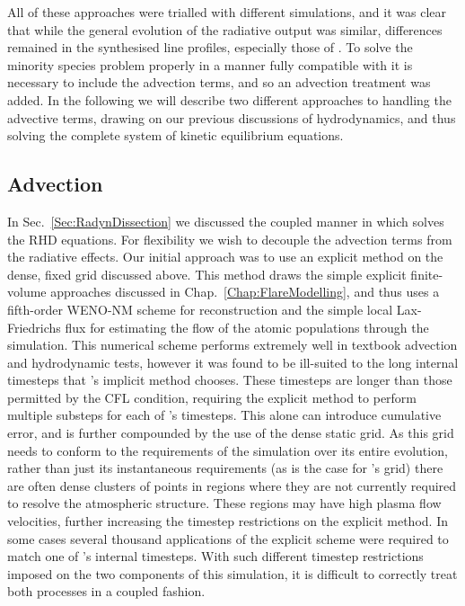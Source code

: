 All of these approaches were trialled with different \Radyn{} simulations, and it was clear that while the general evolution of the radiative output was similar, differences remained in the synthesised line profiles, especially those of \Caii{}.
To solve the minority species problem properly in a manner fully compatible with \Radyn{} it is necessary to include the advection terms, and so an advection treatment was added.
In the following we will describe two different approaches to handling the advective terms, drawing on our previous discussions of hydrodynamics, and thus solving the complete system of kinetic equilibrium equations.

\subsection{Advection}\label{Sec:MsLwAdvection}

In Sec.~\ref{Sec:RadynDissection} we discussed the coupled manner in which \Radyn{} solves the RHD equations.
For flexibility we wish to decouple the advection terms from the radiative effects.
Our initial approach was to use an explicit method on the dense, fixed grid discussed above.
This method draws the simple explicit finite-volume approaches discussed in Chap.~\ref{Chap:FlareModelling}, and thus uses a fifth-order WENO-NM scheme for reconstruction and the simple local Lax-Friedrichs flux for estimating the flow of the atomic populations through the simulation.
This numerical scheme performs extremely well in textbook advection and hydrodynamic tests, however it was found to be ill-suited to the long internal timesteps that \Radyn{}'s implicit method chooses.
These timesteps are longer than those permitted by the CFL condition, requiring the explicit method to perform multiple substeps for each of \Radyn{}'s timesteps.
This alone can introduce cumulative error, and is further compounded by the use of the dense static grid.
As this grid needs to conform to the requirements of the simulation over its entire evolution, rather than just its instantaneous requirements (as is the case for \Radyn{}'s grid) there are often dense clusters of points in regions where they are not currently required to resolve the atmospheric structure.
These regions may have high plasma flow velocities, further increasing the timestep restrictions on the explicit method.
In some cases several thousand applications of the explicit scheme were required to match one of \Radyn{}'s internal timesteps.
With such different timestep restrictions imposed on the two components of this simulation, it is difficult to correctly treat both processes in a coupled fashion.

